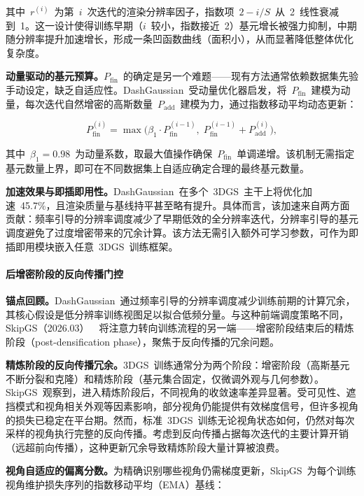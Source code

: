 其中~$r^{(i)}$~为第~$i$~次迭代的渲染分辨率因子，指数项~$2 - i/S$~从~2~线性衰减到~1。这一设计使得训练早期（$i$~较小，指数接近~2）基元增长被强力抑制，中期随分辨率提升加速增长，形成一条凹函数曲线（面积小），从而显著降低整体优化复杂度。

\textbf{动量驱动的基元预算。}$P_{\text{fin}}$~的确定是另一个难题——现有方法通常依赖数据集先验手动设定，缺乏自适应性。DashGaussian~受动量优化器启发，将~$P_{\text{fin}}$~建模为动量，每次迭代自然增密的高斯数量~$P_{\text{add}}$~建模为力，通过指数移动平均动态更新：

\begin{equation}
    P_{\text{fin}}^{(i)} = \max\!\big(\beta_1 \cdot P_{\text{fin}}^{(i-1)},\; P_{\text{fin}}^{(i-1)} + P_{\text{add}}^{(i)}\big),
\end{equation}

其中~$\beta_1 = 0.98$~为动量系数，取最大值操作确保~$P_{\text{fin}}$~单调递增。该机制无需指定基元数量上界，即可在不同数据集上自适应确定合理的最终基元数量。

\textbf{加速效果与即插即用性。}DashGaussian~在多个~3DGS~主干上将优化加速~45.7\%，且渲染质量与基线持平甚至略有提升。具体而言，该加速来自两方面贡献：频率引导的分辨率调度减少了早期低效的全分辨率迭代，分辨率引导的基元调度避免了过度增密带来的冗余计算。该方法无需引入额外可学习参数，可作为即插即用模块嵌入任意~3DGS~训练框架。

\paragraph{后增密阶段的反向传播门控}

\textbf{锚点回顾。}DashGaussian~通过频率引导的分辨率调度减少训练前期的计算冗余，其核心假设是低分辨率训练视图足以拟合低频分量。与这种前端调度策略不同，SkipGS（2026.03）~\cite{2603_08997}~将注意力转向训练流程的另一端——增密阶段结束后的精炼阶段（post-densification phase），聚焦于反向传播的冗余问题。

\textbf{精炼阶段的反向传播冗余。}3DGS~训练通常分为两个阶段：增密阶段（高斯基元不断分裂和克隆）和精炼阶段（基元集合固定，仅微调外观与几何参数）。SkipGS~观察到，进入精炼阶段后，不同视角的收敛速率差异显著。受可见性、遮挡模式和视角相关外观等因素影响，部分视角仍能提供有效梯度信号，但许多视角的损失已稳定在平台期。然而，标准~3DGS~训练无论视角状态如何，仍然对每次采样的视角执行完整的反向传播。考虑到反向传播占据每次迭代的主要计算开销（远超前向传播），这种更新冗余导致精炼阶段大量计算被浪费。

\textbf{视角自适应的偏离分数。}为精确识别哪些视角仍需梯度更新，SkipGS~为每个训练视角维护损失序列的指数移动平均（EMA）基线：

